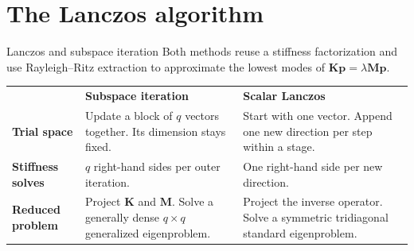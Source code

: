 \documentclass[aspectratio=169]{beamer}
\begin{document}
\section{The Lanczos algorithm}

\begin{frame}{Lanczos and subspace iteration}
  \small
  Both methods reuse a stiffness factorization and use Rayleigh--Ritz
  extraction to approximate the lowest modes of
  $\mathbf K\mathbf p=\lambda\mathbf M\mathbf p$.

  \medskip
  \centering
  \renewcommand{\arraystretch}{1.32}
  \begin{tabular}{@{}>{\raggedright\arraybackslash}p{.18\linewidth}
    >{\raggedright\arraybackslash}p{.37\linewidth}
    >{\raggedright\arraybackslash}p{.37\linewidth}@{}}
    \rowcolor{darkred!15}
                                                                       & \textbf{Subspace iteration} & \textbf{Scalar Lanczos} \\
    \textbf{Trial space}                                               &
    Update a block of $q$ vectors together. Its dimension stays fixed. &
    Start with one vector. Append one new direction per step within a stage.                                                   \\[5pt]
    \textbf{Stiffness solves}                                          &
    $q$ right-hand sides per outer iteration.                          &
    One right-hand side per new direction.                                                                                     \\[5pt]
    \textbf{Reduced problem}                                           &
    Project $\mathbf K$ and $\mathbf M$. Solve a generally dense
    $q\times q$ generalized eigenproblem.                              &
    Project the inverse operator. Solve a symmetric tridiagonal
    standard eigenproblem.                                                                                                     \\
  \end{tabular}
\end{frame}
\end{document}
